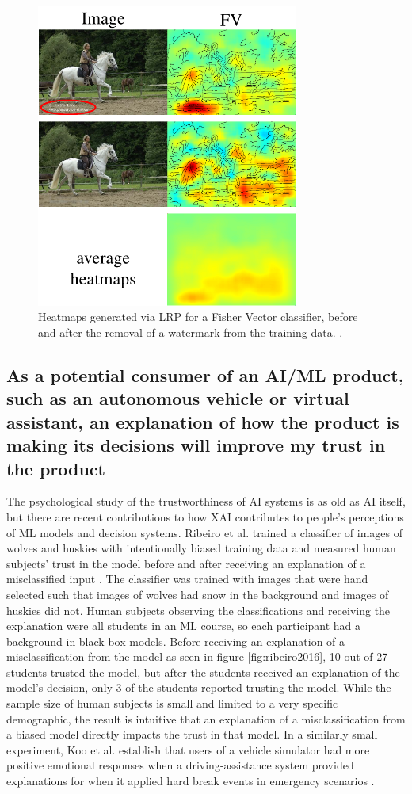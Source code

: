 \begin{figure}
    \centering
    \includegraphics[width=3.4in]{media/bach2016.png}
    \caption{Heatmaps generated via LRP for a Fisher Vector classifier, before and after the removal of a watermark from the training data. \cite{Bach2016AnalyzingCF}.}
    \label{fig:bach2016}
\end{figure}

\subsection{As a potential consumer of an AI/ML product, such as an autonomous vehicle or virtual assistant, an explanation of how the product is making its decisions will improve my trust in the product}\label{subsec:UseCase2}

The psychological study of the trustworthiness of AI systems is as old as AI itself, but there are recent contributions to how XAI contributes to people's perceptions of ML models and decision systems.  Ribeiro et al. trained a classifier of images of wolves and huskies with intentionally biased training data and measured human subjects' trust in the model before and after receiving an explanation of a misclassified input \cite{Ribeiro:2016:WIT:2939672.2939778}.  The classifier was trained with images that were hand selected such that images of wolves had snow in the background and images of huskies did not.  Human subjects observing the classifications and receiving the explanation were all students in an ML course, so each participant had a background in black-box models.  Before receiving an explanation of a misclassification from the model as seen in figure \ref{fig:ribeiro2016}, 10 out of 27 students trusted the model, but after the students received an explanation of the model's decision, only 3 of the students reported trusting the model.  While the sample size of human subjects is small and limited to a very specific demographic, the result is intuitive that an explanation of a misclassification from a biased model directly impacts the trust in that model.  In a similarly small experiment, Koo et al. establish that users of a vehicle simulator had more positive emotional responses when a driving-assistance system provided explanations for when it applied hard break events in emergency scenarios \cite{Koo2015}.

